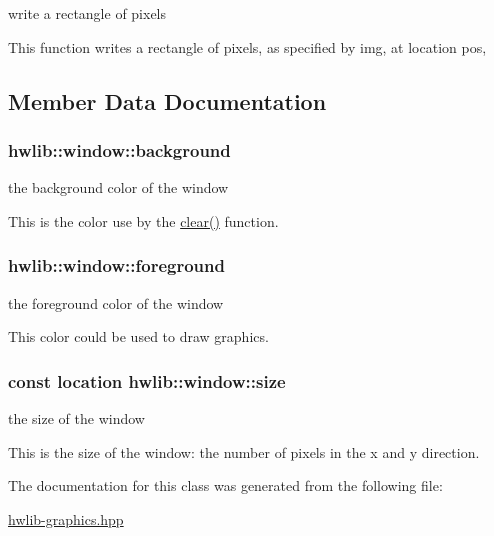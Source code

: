write a rectangle of pixels 

This function writes a rectangle of pixels, as specified by img, at location pos, 

\subsection{Member Data Documentation}
\subsubsection[{\texorpdfstring{background}{background}}]{ hwlib\+::window\+::background}\hypertarget{classhwlib_1_1window_a1ca47e79ec54ea8b2f38b41b42593d2d}{}\label{classhwlib_1_1window_a1ca47e79ec54ea8b2f38b41b42593d2d}


the background color of the window 

This is the color use by the \hyperlink{classhwlib_1_1window_a5e781163353ce26cb4dc5b2cbe40ad05}{clear()} function. 
\subsubsection[{\texorpdfstring{foreground}{foreground}}]{ hwlib\+::window\+::foreground}\hypertarget{classhwlib_1_1window_a812e3bf440309bf3280d34fa04eeb718}{}\label{classhwlib_1_1window_a812e3bf440309bf3280d34fa04eeb718}


the foreground color of the window 

This color could be used to draw graphics. 
\subsubsection[{\texorpdfstring{size}{size}}]{\setlength{\rightskip}{0pt plus 5cm}const {\bf location} hwlib\+::window\+::size}\hypertarget{classhwlib_1_1window_ad2ad5281c9c09d18010b19cb807d3eaa}{}\label{classhwlib_1_1window_ad2ad5281c9c09d18010b19cb807d3eaa}


the size of the window 

This is the size of the window\+: the number of pixels in the x and y direction. 

The documentation for this class was generated from the following file\+:\begin{DoxyCompactItemize}
\item 
\hyperlink{hwlib-graphics_8hpp}{hwlib-\/graphics.\+hpp}\end{DoxyCompactItemize}
